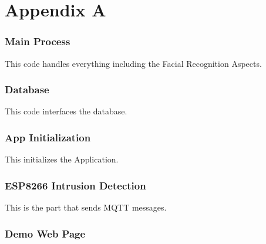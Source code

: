 \chapter*{Appendix A}
\subsection*{Main Process}
    \begin{flushleft}
        This code handles everything including the Facial Recognition Aspects.
    \end{flushleft}

    

\subsection*{Database}
    \begin{flushleft}
        This code interfaces the database.
    \end{flushleft}
    
    

\subsection*{App Initialization}
    \begin{flushleft}
        This initializes the Application.
    \end{flushleft}
    

\subsection*{ESP8266 Intrusion Detection}
    \begin{flushleft}
        This is the part that sends MQTT messages.
    \end{flushleft}
    

\subsection*{Demo Web Page}
    